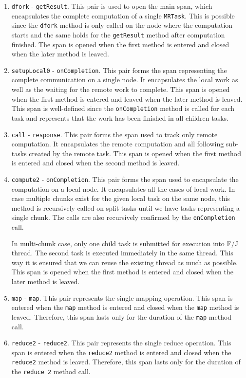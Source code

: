 \begin{enumerate}
	\item \texttt{dfork} - \texttt{getResult}. This pair is used to open the main span, which encapsulates the complete computation of a single \texttt{MRTask}. This is possible since the \texttt{dfork} method is only called on the node where the computation starts and the same holds for the \texttt{getResult} method after computation finished. The span is opened when the first method is entered and closed when the later method is leaved.
		
	\item \texttt{setupLocal0} - \texttt{onCompletion}. This pair forms the span representing the complete communication on a single node. It encapsulates the local work as well as the waiting for the remote work to complete. This span is opened when the first method is entered and leaved when the later method is leaved. This span is well-defined since the \texttt{onCompletion} method is called for each task and represents that the work has been finished in all children tasks.
	
	\item \texttt{call} - \texttt{response}. This pair forms the span used to track only remote computation. It encapsulates the remote computation and all following sub-tasks created by the remote task. This span is opened when the first method is entered and closed when the second method is leaved.
	
	\item \texttt{compute2} - \texttt{onCompletion}. This pair forms the span used to encapsulate the computation on a local node. It encapsulates all the cases of local work. In case multiple chunks exist for the given local task on the same node, this method is recursively called on split tasks until we have tasks representing a single chunk. The calls are also recursively confirmed by the \texttt{onCompletion} call. 
	
	In multi-chunk case, only one child task is submitted for execution into F/J thread. The second task is executed immediately in the same thread. This way it is ensured that we can reuse the existing thread as much as possible. This span is opened when the first method is entered and closed when the later method is leaved.
	
	\item \texttt{map} - \texttt{map}. This pair represents the single mapping operation. This span is entered when the \texttt{map} method is entered and closed when the \texttt{map} method is leaved. Therefore, this span lasts only for the duration of the \texttt{map} method call.
	
	\item \texttt{reduce2} - \texttt{reduce2}. This pair represents the single reduce operation. This span is entered when the \texttt{reduce2} method is entered and closed when the \texttt{reduce2} method is leaved. Therefore, this span lasts only for the duration of the \texttt{reduce 2} method call.
\end{enumerate}

